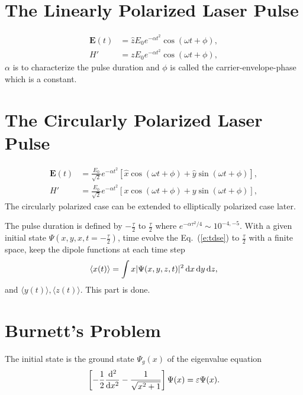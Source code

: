 \documentclass{isildur}
\begin{document}
\section{The Linearly Polarized Laser Pulse}

\begin{align}
  \mathbf{E}(t) &= {\hat z}E_0e^{-\alpha t^2}\cos(\omega t+\phi), \\
  H' &= zE_0e^{-\alpha t^2}\cos(\omega t+\phi),
\end{align}
%
$\alpha$ is to characterize the pulse duration and $\phi$ is called the
carrier-envelope-phase which is a constant.

\section{The Circularly Polarized Laser Pulse}

\begin{align}
  \mathbf{E}(t) &=
    \frac{E_0}{\sqrt 2}e^{-\alpha t^2}
    \left[
      {\hat x}\cos(\omega t+\phi)+{\hat y}\sin(\omega t+\phi)
    \right], \\
  H' &= \frac{E_0}{\sqrt 2}e^{-\alpha t^2}
    \left[
      x\cos(\omega t+\phi) + y\sin(\omega t+\phi)
    \right],
\end{align}
%
The circularly polarized case can be extended to elliptically polarized case
later.

The pulse duration is defined by $-\frac{\tau}{2}$ to $\frac{\tau}{2}$ where
$e^{-\alpha \tau^2/4}\sim 10^{-4,-5}$.  With a given initial state
$\Psi(x,y,x,t=-\frac{\tau}{2})$, time evolve the Eq.~(\ref{e:tdse}) to
$\frac{\tau}{2}$ with a finite space, keep the dipole functions at each time
step
%
\begin{align}
  \langle x(t) \rangle = \int x |\Psi(x,y,z,t)|^2 \mathop{}\!\mathrm{d} x \mathop{}\!\mathrm{d} y \mathop{}\!\mathrm{d} z,
\end{align}
%
and $\langle y(t) \rangle, \langle z(t) \rangle$.  This part is done.

\section{Burnett's Problem}

The initial state is the ground state $\Psi_g(x)$ of the eigenvalue equation
%
\begin{align}
  \left[ -\frac{1}{2}\frac{\mathop{}\!\mathrm{d}^2}{\mathop{}\!\mathrm{d} x^2}-\frac{1}{\sqrt{x^2+1}} \right]
  \Psi(x) = \varepsilon \Psi(x).
\end{align}
\end{document}
